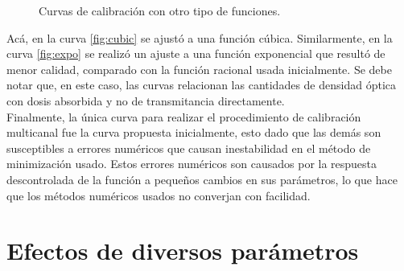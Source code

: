 \begin{figure}[H]
	\centering
	\hfill
	\caption{Curvas de calibración con otro tipo de funciones.}
	\label{fig:CurvasAdicionales}
\end{figure}

Acá, en la curva \ref{fig:cubic} se ajustó a una función cúbica. Similarmente, en la curva \ref{fig:expo} se realizó un ajuste a una función exponencial que resultó de menor calidad, comparado con la función racional usada inicialmente. Se debe notar que, en este caso, las curvas relacionan las cantidades  de densidad óptica con dosis absorbida y no de transmitancia directamente.\\

Finalmente, la única curva para realizar el  procedimiento de calibración multicanal fue la curva propuesta inicialmente, esto dado que las demás son susceptibles a errores numéricos que causan inestabilidad en el método de minimización usado. Estos errores numéricos son causados por la respuesta descontrolada de la función a pequeños cambios en sus parámetros, lo que hace que los métodos numéricos usados no converjan con facilidad.


\section{Efectos de diversos parámetros}

